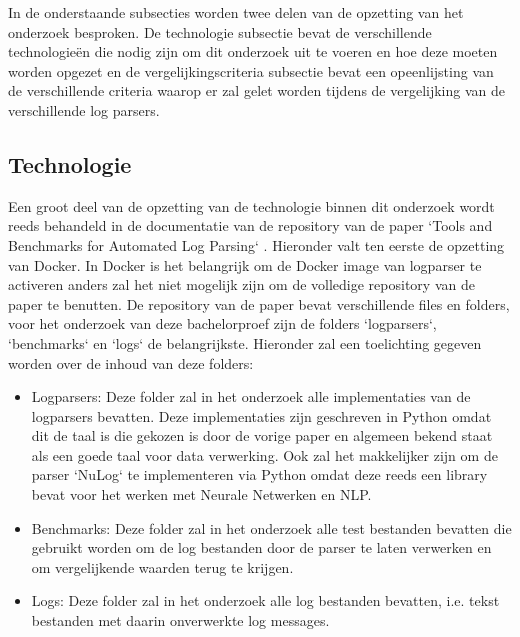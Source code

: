 In de onderstaande subsecties worden twee delen van de opzetting van het onderzoek besproken. De technologie subsectie bevat de verschillende technologieën die nodig zijn om dit onderzoek uit te voeren en hoe deze moeten worden opgezet en de vergelijkingscriteria subsectie bevat een opeenlijsting van de verschillende criteria waarop er zal gelet worden tijdens de vergelijking van de verschillende log parsers.

\subsection{Technologie}
Een groot deel van de opzetting van de technologie binnen dit onderzoek wordt reeds behandeld in de documentatie van de repository van de paper `Tools and Benchmarks for Automated Log Parsing` \autocite{TBA2019}. Hieronder valt ten eerste de opzetting van Docker. In Docker is het belangrijk om de Docker image van logparser te activeren anders zal het niet mogelijk zijn om de volledige repository van de paper te benutten. De repository van de paper bevat verschillende files en folders, voor het onderzoek van deze bachelorproef zijn de folders `logparsers`, `benchmarks` en `logs` de belangrijkste. Hieronder zal een toelichting gegeven worden over de inhoud van deze folders:
\begin{itemize}
    \item Logparsers: Deze folder zal in het onderzoek alle implementaties van de logparsers bevatten. Deze implementaties zijn geschreven in Python omdat dit de taal is die gekozen is door de vorige paper en algemeen bekend staat als een goede taal voor data verwerking. Ook zal het makkelijker zijn om de parser `NuLog` te implementeren via Python omdat deze reeds een library bevat voor het werken met Neurale Netwerken en NLP.\\
    \item Benchmarks: Deze folder zal in het onderzoek alle test bestanden bevatten die gebruikt worden om de log bestanden door de parser te laten verwerken en om vergelijkende waarden terug te krijgen.\\
    \item Logs: Deze folder zal in het onderzoek alle log bestanden bevatten, i.e. tekst bestanden met daarin onverwerkte log messages.
\end{itemize}

